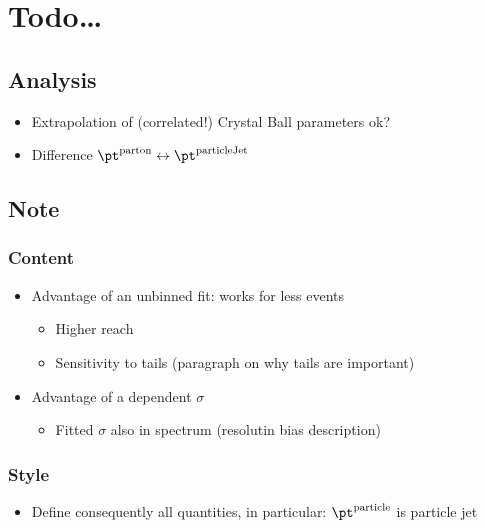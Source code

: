 

\section{Todo\ldots}

\subsection{Analysis}
\begin{itemize}
\item Extrapolation of (correlated!) Crystal Ball parameters ok?
\item Difference $\pt^{\text{parton}} \leftrightarrow \pt^{\text{particleJet}}$
\end{itemize}


\subsection{Note}

\subsubsection{Content}
\begin{itemize}
\item Advantage of an unbinned fit: works for less events
  \begin{itemize}
  \item Higher \pt reach
  \item Sensitivity to tails (paragraph on why tails are important)
  \end{itemize}
\item Advantage of a \pt dependent $\sigma$
  \begin{itemize}
  \item Fitted $\sigma$ also in spectrum (resolutin bias description)
  \end{itemize}
\end{itemize}

\subsubsection{Style}
\begin{itemize}
\item Define consequently all quantities, in particular: $\pt^{\text{particle}}$ is particle jet \pt
\end{itemize}
